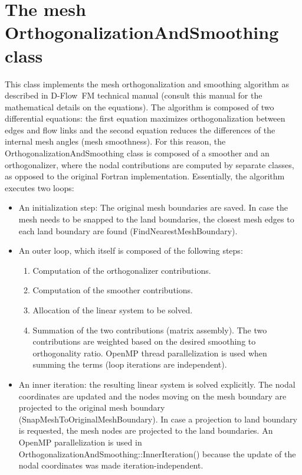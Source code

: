 \documentclass[biblatex]{deltares_manual}
\newcommand{\dflowfm}{D-Flow~FM\xspace}
\begin{document}
\chapter{The mesh OrthogonalizationAndSmoothing class}

This class implements the mesh orthogonalization and smoothing algorithm as described in \dflowfm technical manual (consult this manual for the mathematical details on the equations). The algorithm is composed of two differential equations: the first equation maximizes orthogonalization between edges and flow links and the second equation reduces the differences of the internal mesh angles (mesh smoothness). For this reason, the OrthogonalizationAndSmoothing class is composed of a smoother and an orthogonalizer, where the nodal contributions are computed by separate classes, as opposed to the original Fortran implementation. Essentially, the algorithm executes two loops:
\begin{itemize}
\item An initialization step: The original mesh boundaries are saved. In case the mesh needs to be snapped to the land boundaries, the closest mesh edges to each land boundary are found (FindNearestMeshBoundary).
\item An outer loop, which itself is composed of the following steps:
\begin{enumerate}
\item Computation of the orthogonalizer contributions.
\item Computation of the smoother contributions.
\item Allocation of the linear system to be solved.
\item Summation of the two contributions (matrix assembly).
The two contributions are weighted based on the desired smoothing to orthogonality ratio. OpenMP thread parallelization is used when summing the terms (loop iterations are independent).
\end{enumerate}
\item An inner iteration: the resulting linear system is solved explicitly. The nodal coordinates are updated and the nodes moving on the mesh boundary are projected to the original mesh boundary (SnapMeshToOriginalMeshBoundary). In case a projection to land boundary is requested, the mesh nodes are projected to the land boundaries. An OpenMP parallelization is used in OrthogonalizationAndSmoothing::InnerIteration() because the update of the nodal coordinates was made iteration-independent.
\end{itemize}
\end{document}
